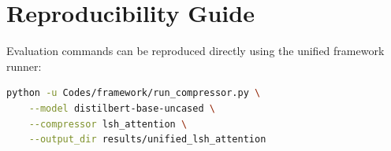 \section{Reproducibility Guide}
Evaluation commands can be reproduced directly using the unified framework runner:
\begin{lstlisting}[language=bash]
python -u Codes/framework/run_compressor.py \
    --model distilbert-base-uncased \
    --compressor lsh_attention \
    --output_dir results/unified_lsh_attention
\end{lstlisting}
